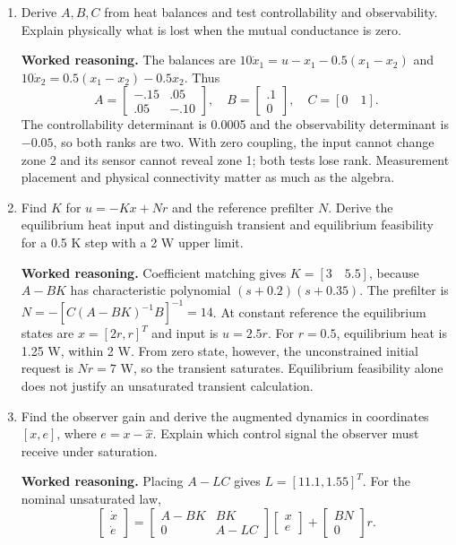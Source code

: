 \documentclass[10pt,a4paper]{article}
\newcommand{\answer}{\par\smallskip\textbf{Worked reasoning.} }
\begin{document}
\begin{enumerate}
\item Derive $A,B,C$ from heat balances and test controllability and observability. Explain physically what is lost when the mutual conductance is zero.
\answer The balances are $10\dot x_1=u-x_1-0.5(x_1-x_2)$ and $10\dot x_2=0.5(x_1-x_2)-0.5x_2$. Thus
\[
A=\begin{bmatrix}-.15&.05\\.05&-.10\end{bmatrix},\quad
B=\begin{bmatrix}.1\\0\end{bmatrix},\quad C=[0\quad1].
\]
The controllability determinant is 0.0005 and the observability determinant is $-0.05$, so both ranks are two. With zero coupling, the input cannot change zone 2 and its sensor cannot reveal zone 1; both tests lose rank. Measurement placement and physical connectivity matter as much as the algebra.
\item Find $K$ for $u=-Kx+Nr$ and the reference prefilter $N$. Derive the equilibrium heat input and distinguish transient and equilibrium feasibility for a 0.5 K step with a 2 W upper limit.
\answer Coefficient matching gives $K=[3\quad5.5]$, because $A-BK$ has characteristic polynomial $(s+0.2)(s+0.35)$. The prefilter is $N=-[C(A-BK)^{-1}B]^{-1}=14$. At constant reference the equilibrium states are $x=[2r,r]^T$ and input is $u=2.5r$. For $r=0.5$, equilibrium heat is 1.25 W, within 2 W. From zero state, however, the unconstrained initial request is $Nr=7$ W, so the transient saturates. Equilibrium feasibility alone does not justify an unsaturated transient calculation.
\item Find the observer gain and derive the augmented dynamics in coordinates $[x,e]$, where $e=x-\hat x$. Explain which control signal the observer must receive under saturation.
\answer Placing $A-LC$ gives $L=[11.1,1.55]^T$. For the nominal unsaturated law,
\[
\begin{bmatrix}\dot x\\\dot e\end{bmatrix}
=\begin{bmatrix}A-BK&BK\\0&A-LC\end{bmatrix}
\begin{bmatrix}x\\e\end{bmatrix}+\begin{bmatrix}BN\\0\end{bmatrix}r.
\]
\end{enumerate}
\end{document}
